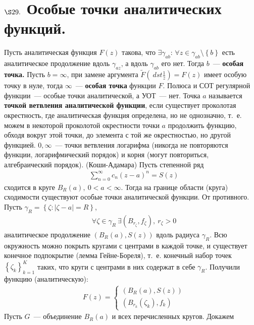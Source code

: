 \section{$\S 29.$ Особые точки аналитических функций.}
\Def
Пусть аналитическая функция $F(z)$ такова, что $\exists \gamma_{ab}$: $\forall z
\in \gamma_{ab}\setminus \left\{ b \right\}$ есть аналитическое продолжение
вдоль $\gamma_{az}$, а вдоль $\gamma_{ab}$ его нет. Тогда $b$~--- \textbf{особая
  точка.}
\Def
Пусть $b = \infty$, при замене аргумента $\tilde{F}\left( \
dst \frac{1}{z}\right) = F(z)$ имеет особую точку в нуле, тогда $\infty$~---
\textbf{особая точка} функции $F$.
\Note
Полюса и СОТ регулярной функции~--- особые точки аналитической, а УОТ~--- нет.
\Def
Точка $a$ называется \textbf{точкой ветвления аналитической функции}, если
существует проколотая окрестность, где аналитическая функция определена, но не
однозначно, т.~е. можем в некоторой проколотой окрестности точки $a$ продолжить
функцию, обходя вокруг этой точки, до элемента с той же окрестностью, но другой
функцией.
\Example
$0, \infty$~--- точки ветвления логарифма (никогда не повторяются функции,
логарифмический порядок) и корня (могут повториться, алгебраический порядок).
\theorem (Коши-Адамара)
Пусть степенной ряд
\begin{align*}
  & \sum_{n=0}^\infty c_n(z-a)^n = S(z)
\end{align*}
сходится в круге $B_R(a), \ 0 < a < \infty$. Тогда на границе области (круга)
сходимости существуют особые точки аналитической функции.
\pr
От противного. Пусть $\gamma_R = \left\{ \zeta: \left| \zeta - a \right| = R
\right\}$,
\begin{align*}
  &\forall \zeta \in \gamma_R \ \exists \left( B_{r_\zeta}, f_\zeta \right), \ r_\zeta > 0
\end{align*}
аналитическое продолжение $\left( B_R(a), S(z) \right)$ вдоль радиуса
$\gamma_R$. Всю окружность можно покрыть кругами с центрами в каждой точке, и
существует конечное подпокрытие (лемма Гейне-Бореля), т.~е. конечный набор точек
$\left\{ \zeta_k \right\}_{k=1}^K$ таких, что круги с центрами в них содержат в
себе $\gamma_R$. Получили функцию (аналитическую):
\begin{align*}
  & F(z) = \begin{cases}
      \left( B_R(a), S(z) \right) \\
      \left( B_{r_k}(\zeta_k), f_k \right)
  \end{cases}
\end{align*}
Пусть $G$~--- объединение $B_R(a)$ и всех перечисленных кругов. Докажем
